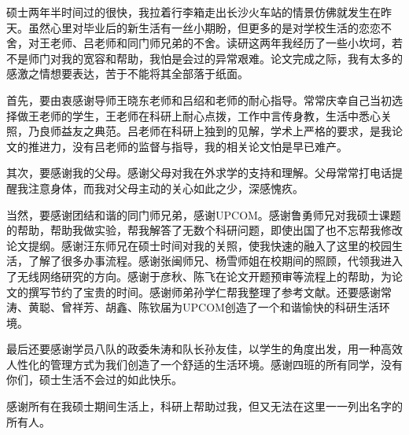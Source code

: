

\begin{ack}
  硕士两年半时间过的很快，我拉着行李箱走出长沙火车站的情景仿佛就发生在昨天。虽然心里对毕业后的新生活有一丝小期盼，但更多的是对学校生活的恋恋不舍，对王老师、吕老师和同门师兄弟的不舍。读研这两年我经历了一些小坎坷，若不是师门对我的宽容和帮助，我怕是会过的异常艰难。论文完成之际，我有太多的感激之情想要表达，苦于不能将其全部落于纸面。

  首先，要由衷感谢导师王晓东老师和吕绍和老师的耐心指导。常常庆幸自己当初选择做王老师的学生，王老师在科研上耐心点拨，工作中言传身教，生活中悉心关照，乃良师益友之典范。吕老师在科研上独到的见解，学术上严格的要求，是我论文的推进力，没有吕老师的监督与指导，我的相关论文怕是早已难产。

  其次，要感谢我的父母。感谢父母对我在外求学的支持和理解。父母常常打电话提醒我注意身体，而我对父母主动的关心如此之少，深感愧疚。

  当然，要感谢团结和谐的同门师兄弟，感谢UPCOM。感谢鲁勇师兄对我硕士课题的帮助，帮助我做实验，帮我解答了无数个科研问题，即使出国了也不忘帮我修改论文提纲。感谢汪东师兄在硕士时间对我的关照，使我快速的融入了这里的校园生活，了解了很多办事流程。感谢张闽师兄、杨雪师姐在校期间的照顾，代领我进入了无线网络研究的方向。感谢于彦秋、陈飞在论文开题预审等流程上的帮助，为论文的撰写节约了宝贵的时间。感谢师弟孙学仁帮我整理了参考文献。还要感谢常涛、黄聪、曾祥芳、胡鑫、陈钦届为UPCOM创造了一个和谐愉快的科研生活环境。

  最后还要感谢学员八队的政委朱涛和队长孙友佳，以学生的角度出发，用一种高效人性化的管理方式为我们创造了一个舒适的生活环境。感谢四班的所有同学，没有你们，硕士生活不会过的如此快乐。

  感谢所有在我硕士期间生活上，科研上帮助过我，但又无法在这里一一列出名字的所有人。

\end{ack}
